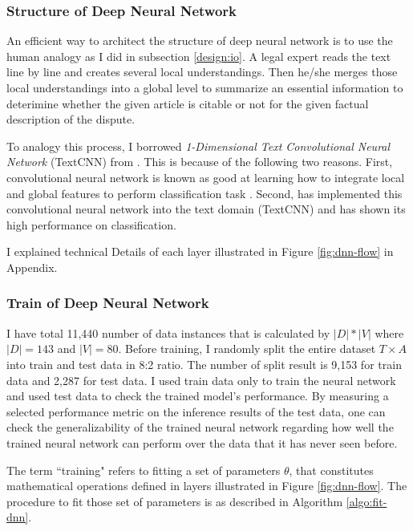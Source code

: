 \documentclass[12pt,letterpaper]{article}
\begin{document}
\subsubsection{Structure of Deep Neural Network}


An efficient way to architect the structure of deep neural network is to use the
human analogy as I did in subsection \ref{design:io}.
A legal expert reads the text line by line and creates several local understandings.
Then he/she merges those local understandings into a global level to summarize
an essential information to deterimine whether
the given article is citable or not for the given factual description of the dispute.

To analogy this process, I borrowed \textit{1-Dimensional Text Convolutional Neural Network} (TextCNN) from \cite{textcnn}.
This is because of the following two reasons.
First, convolutional neural network is known as good at learning how to integrate local and global features to perform classification task \citep{554195, 8227460}.
Second, \cite{textcnn} has implemented this convolutional neural network into the text domain (TextCNN)
and has shown its high performance on classification.

I explained technical Details of each layer illustrated in Figure \ref{fig:dnn-flow} in Appendix.


\subsubsection{Train of Deep Neural Network}
I have total 11,440 number of data instances that is calculated by $|D| * |V|$ where $|D| = 143$ and $|V|=80$.
Before training, I randomly split the entire dataset $T \times A$ into train and test data in 8:2 ratio.
The number of split result is 9,153 for train data and 2,287 for test data.
I used train data only to train the neural network and used test data to check the trained model's performance.
By measuring a selected performance
metric on the inference results of the test data, one can check the generalizability of the trained neural network regarding
how well the trained neural network can perform over the data that it has never seen before.

The term ``training" refers to fitting a set of parameters $\theta$,
that constitutes mathematical operations defined in layers illustrated in Figure \ref{fig:dnn-flow}.
The procedure to fit those set of parameters is as described in Algorithm \ref{algo:fit-dnn}.
\end{document}
